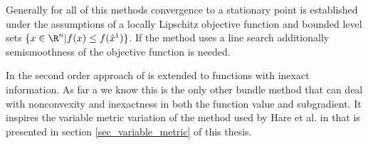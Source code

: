 Generally for all of this methods convergence to a stationary point is established under the assumptions of a locally Lipschitz objective function and bounded level sets \(\{x \in \R^n | f(x) \leq f(\hat{x}^1)\}\).
If the method uses a line search additionally semismoothness of the objective function is needed.

In \cite{Noll2013} the second order approach of \cite{Noll2012} is extended to functions with inexact information.
As far a we know this is the only other bundle method that can deal with nonconvexity and inexactness in both the function value and subgradient. It inspires the variable metric variation of the method used by Hare et al. in \cite{Hare2016} that is presented in section \ref{sec_variable_metric} of this thesis.

